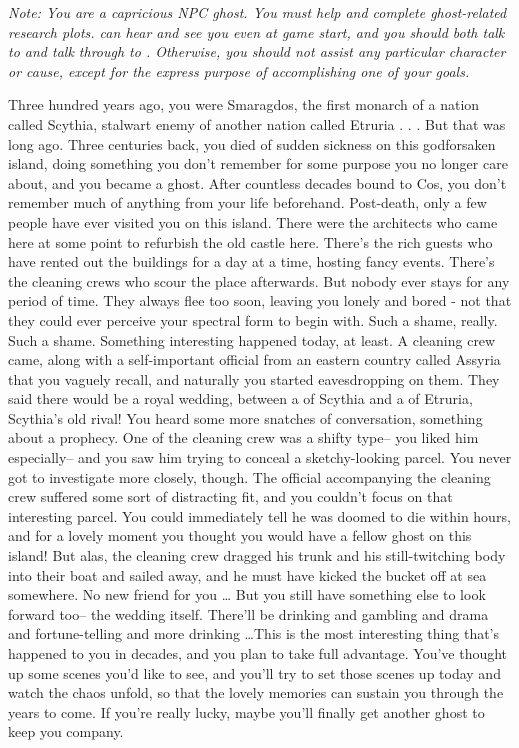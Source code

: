 \documentclass[char]{Kos}
\begin{document}
\name{\cEmeraldQueen{}}

	\emph{Note: You are a capricious NPC ghost. You must help \cAnarchist{} and \cButler{} complete ghost-related research plots. \cButler{} can hear and see you even at game start, and you should both talk to \cButler{\them} and talk through \cButler{\them} to \cAnarchist{}. Otherwise, you should not assist any particular character or cause, except for the express purpose of accomplishing one of your goals.}
	
	Three hundred years ago, you were Smaragdos, the first monarch of a nation called Scythia, stalwart enemy of another nation called Etruria . . . But that was long ago. Three centuries back, you died of sudden sickness on this godforsaken island, doing something you don't remember for some purpose you no longer care about, and you became a ghost. After countless decades bound to Cos, you don't remember much of anything from your life beforehand.
	 Post-death, only a few people have ever visited you on this island. There were the architects who came here at some point to refurbish the old castle here. There's the rich guests who have rented out the buildings for a day at a time, hosting fancy events. There's the cleaning crews who scour the place afterwards. But nobody ever stays for any period of time. They always flee too soon, leaving you lonely and bored - not that they could ever perceive your spectral form to begin with. Such a shame, really. Such a shame.
	 Something interesting happened today, at least. A cleaning crew came, along with a self-important official from an eastern country called Assyria that you vaguely recall, and naturally you started eavesdropping on them. They said there would be a royal wedding, between a \cBride{\prince} of Scythia and a \cGroom{\prince} of Etruria, Scythia's old rival! You heard some more snatches of conversation, something about a prophecy. One of the cleaning crew was a shifty type-- you liked him especially-- and you saw him trying to conceal a sketchy-looking parcel. You never got to investigate more closely, though. The official accompanying the cleaning crew suffered some sort of distracting fit, and you couldn't focus on that interesting parcel. You could immediately tell he was doomed to die within hours, and for a lovely moment you thought you would have a fellow ghost on this island! But alas, the cleaning crew dragged his trunk and his still-twitching body into their boat and sailed away, and he must have kicked the bucket off at sea somewhere. No new friend for you \ldots
	 But you still have something else to look forward too-- the wedding itself. There'll be drinking and gambling and drama and fortune-telling and more drinking \ldots This is the most interesting thing that's happened to you in decades, and you plan to take full advantage. You've thought up some scenes you'd like to see, and you'll try to set those scenes up today and watch the chaos unfold, so that the lovely memories can sustain you through the years to come.
	 If you're really lucky, maybe you'll finally get another ghost to keep you company.
\end{document}
